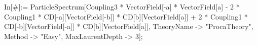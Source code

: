 In[\#]:= ParticleSpectrum[Coupling3 * VectorField[-a] * VectorField[a] - 2 * Coupling1 * CD[-a][VectorField[-b]] * CD[b][VectorField[a]] + 2 * Coupling1 * CD[-b][VectorField[-a]] * CD[b][VectorField[a]], TheoryName -> "ProcaTheory", Method -> "Easy", MaxLaurentDepth -> 3]; 